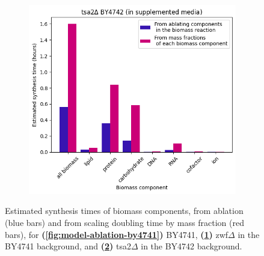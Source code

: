 \begin{figure}
\begin{subfigure}[htpb]{0.45\textwidth}
   \caption{
   }
   \label{fig:model-ablation-zwf1}
  \end{subfigure}
  \begin{subfigure}[htpb]{0.45\textwidth}
   \centering
   \includegraphics[width=\textwidth]{ablation_tsa2}
   \caption{
   }
   \label{fig:model-ablation-tsa2}
  \end{subfigure}
  \caption[
    Estimated synthesis times of biomass components, for BY4741, zwf$\Delta$, and tsa2$\Delta$
  ]{
    Estimated synthesis times of biomass components, from ablation (blue bars) and from scaling doubling time by mass fraction (red bars), for \textbf{(\ref{fig:model-ablation-by4741})} BY4741, \textbf{(\ref{fig:model-ablation-zwf1})} zwf$\Delta$ in the BY4741 background, and \textbf{(\ref{fig:model-ablation-tsa2})} tsa2$\Delta$ in the BY4742 background.
  }
  \label{fig:model-ablation-strains}
\end{figure}

